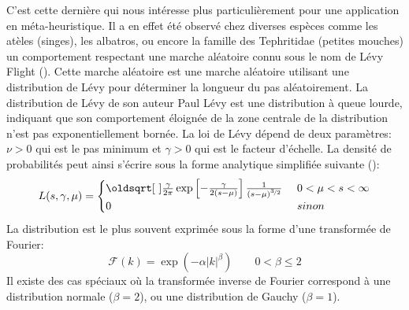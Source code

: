 C’est cette dernière qui nous intéresse plus particulièrement pour une application en méta-heuristique.
Il a en effet été observé chez diverses espèces comme les atèles (singes), les albatros,
ou encore la famille des Tephritidae (petites mouches) un comportement respectant
une marche aléatoire connu sous le nom de Lévy Flight (\cite{Sharma2012213,Yang201445}).
Cette marche aléatoire est une marche aléatoire utilisant une distribution de Lévy pour
déterminer la longueur du pas aléatoirement.
La distribution de Lévy de son auteur Paul Lévy est une distribution à queue lourde, indiquant que son comportement
éloignée de la zone centrale de la distribution n’est pas exponentiellement bornée.
La loi de Lévy dépend de deux paramètres: $\nu > 0$ qui est le pas minimum et $\gamma > 0$ qui est le
facteur d’échelle.
La densité de probabilités peut ainsi s’écrire sous la forme analytique simplifiée suivante (\cite{Yang201445}):
\begin{align}\label{eq:dens_levy}
    L(s, \gamma, \mu) = \begin{cases}
                            \sqrt{\frac{\gamma}{2\pi}} \exp\left[-\frac{\gamma}{2(s-\mu)}\right] \frac{1}{(s-\mu)^{\nicefrac{3}{2}}} &\ 0 < \mu < s < \infty \\
                            0                                                                                                        &\ sinon
                        \end{cases}
\end{align}
La distribution est le plus souvent exprimée sous la forme d’une transformée de Fourier:
\begin{equation}\label{eq:fourier_levy}
    \mathcal{F}(k) = \exp(-\alpha\mathopen{|}k\mathclose{|}^{\beta}) \qquad  0 < \beta \leq 2
\end{equation}
Il existe des cas spéciaux où la transformée inverse de Fourier correspond à une distribution
normale ($\beta = 2$), ou une distribution de Gauchy ($\beta = 1$).

